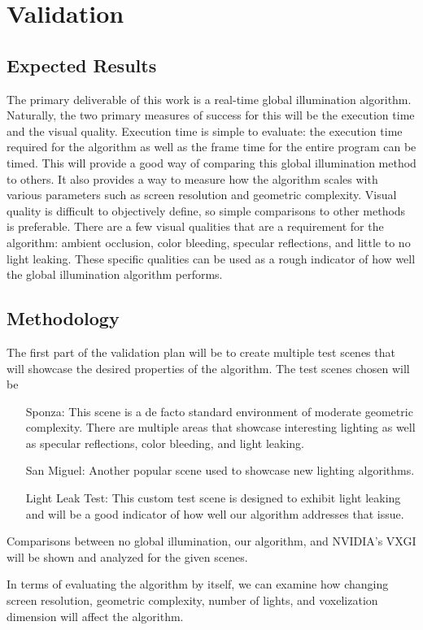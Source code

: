 \chapter{Validation}

\section{Expected Results}
The primary deliverable of this work is a real-time global illumination algorithm. Naturally, the two primary measures of success for this will be the execution time and the visual quality. Execution time is simple to evaluate: the execution time required for the algorithm as well as the frame time for the entire program can be timed. This will provide a good way of comparing this global illumination method to others. It also provides a way to measure how the algorithm scales with various parameters such as screen resolution and geometric complexity. Visual quality is difficult to objectively define, so simple comparisons to other methods is preferable. There are a few visual qualities that are a requirement for the algorithm: ambient occlusion, color bleeding, specular reflections, and little to no light leaking. These specific qualities can be used as a rough indicator of how well the global illumination algorithm performs.

\section{Methodology}
The first part of the validation plan will be to create multiple test scenes that will showcase the desired properties of the algorithm. The test scenes chosen will be

\begin{enumerate}
\item[Sponza: ] This scene is a de facto standard environment of moderate geometric complexity. There are multiple areas that showcase interesting lighting as well as specular reflections, color bleeding, and light leaking.
\item[San Miguel: ] Another popular scene used to showcase new lighting algorithms.
\item[Light Leak Test: ] This custom test scene is designed to exhibit light leaking and will be a good indicator of how well our algorithm addresses that issue.
\end{enumerate}

Comparisons between no global illumination, our algorithm, and NVIDIA's VXGI will be shown and analyzed for the given scenes.

In terms of evaluating the algorithm by itself, we can examine how changing screen resolution, geometric complexity, number of lights, and voxelization dimension will affect the algorithm. 

